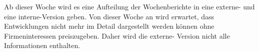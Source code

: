 Ab dieser Woche wird es eine Aufteilung der Wochenberichte in eine externe- und eine interne-Version geben. Von dieser Woche an wird erwartet, dass Entwicklungen nicht mehr im Detail dargestellt werden können ohne Firmeninteressen preiszugeben. Daher wird die externe- Version nicht alle Informationen enthalten.